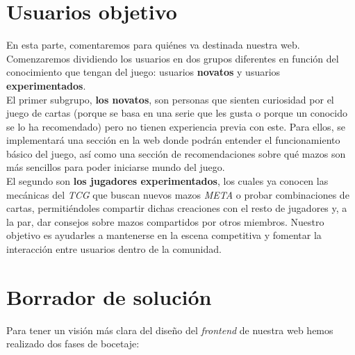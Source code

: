 \documentclass[10pt]{article}
\begin{document}
	
	\section{Usuarios objetivo}
	En esta parte, comentaremos para quiénes va destinada nuestra web. Comenzaremos dividiendo los usuarios en dos grupos diferentes en función del conocimiento que tengan del juego: usuarios \textbf{novatos} y usuarios \textbf{experimentados}.\\
	
	El primer subgrupo, \textbf{los novatos}, son personas que sienten curiosidad por el juego de cartas (porque se basa en una serie que les gusta o porque un conocido se lo ha recomendado) pero no tienen experiencia previa con este. Para ellos, se implementará una sección en la web donde podrán entender el funcionamiento básico del juego, así como una sección de recomendaciones sobre qué mazos son más sencillos para poder iniciarse mundo del juego.\\
	
	El segundo son \textbf{los jugadores experimentados}, los cuales ya conocen las mecánicas del \textit{TCG} que buscan nuevos mazos \textit{META} o probar combinaciones de cartas, permitiéndoles compartir dichas creaciones con el resto de jugadores y, a la par, dar consejos sobre mazos compartidos por otros miembros. Nuestro objetivo es ayudarles a mantenerse en la escena competitiva y fomentar la interacción entre usuarios dentro de la comunidad.
	\newpage
	
	\section{Borrador de solución}
	Para tener un visión más clara del diseño del \textit{frontend} de nuestra web hemos realizado dos fases de bocetaje:
\end{document}
